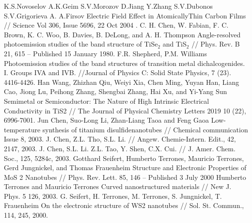 \begin{thebibliography}{3}
K.S.Novoselov A.K.Geim S.V.Morozov D.Jiang Y.Zhang S.V.Dubonos S.V.Grigorieva A. A.Firsov Electric Field Effect in AtomicallyThin Carbon Films // Science Vol 306, Issue 5696, 22 Oct 2004 .
 C. H. Chen, W. Fabian, F. C. Brown, K. C. Woo, B. Davies, B. DeLong, and A. H. Thompson
Angle-resolved photoemission studies of the band structure of TiSe$_{2}$ and TiS$_{2}$ // Phys. Rev. B 21, 615 – Published 15 January 1980.
 F.R. Shepherd, P.M. Williams Photoemission studies of the band structures of transition metal dichalcogenides. I. Groups IVA and IVB. //Journal of Physics C: Solid State Physics, 7 (23). 4416-4426.
 Han Wang, Zhizhan Qiu, Weiyi Xia, Chen Ming, Yuyan Han, Liang Cao, Jiong Lu, Peihong Zhang, Shengbai Zhang, Hai Xu, and Yi-Yang Sun Semimetal or Semiconductor: The Nature of High Intrinsic Electrical Conductivity in TiS2 // The Journal of Physical Chemistry Letters 2019 10 (22), 6996-7001.
 Jun Chen, Suo-Long Li, Zhan-Liang Taoa and Feng Gaoa Low-temperature synthesis of titanium disulfidenanotubes //  Chemical communication Issue 8, 2003.
 J. Chen, Z.L. Tho, S.L. Li. // Angew. Chemie-Intern. Edit., 42, 2147, 2003.
 J. Chen, S.L. Li. Z.L. Tao, Y. Shen, C.X. Cui. // J. Amer. Chem. Soc., 125, 5284c, 2003.
 Gotthard Seifert, Humberto Terrones, Mauricio Terrones, Gerd Jungnickel, and Thomas Frauenheim Structure and Electronic Properties of MoS 2 Nanotubes // Phys. Rev. Lett. 85, 146 – Published 3 July 2000
 Humberto Terrones and Mauricio Terrones Curved nanostructured materials // New J. Phys. 5 126, 2003.
 G. Seifert, H. Terrones, M. Terrones, S. Jungnickel, T. Frauenheim On the electronic structure of WS2 nanotubes //  Sol. St. Commun., 114, 245, 2000.
\end{thebibliography}
